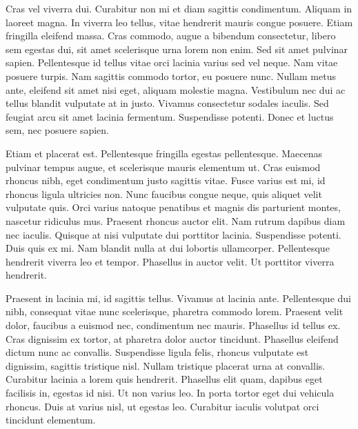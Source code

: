 \documentclass{article}
\begin{document}
Cras vel viverra dui. Curabitur non mi et diam sagittis condimentum. Aliquam in laoreet magna. In viverra leo tellus, vitae hendrerit mauris congue posuere. Etiam fringilla eleifend massa. Cras commodo, augue a bibendum consectetur, libero sem egestas dui, sit amet scelerisque urna lorem non enim. Sed sit amet pulvinar sapien. Pellentesque id tellus vitae orci lacinia varius sed vel neque. Nam vitae posuere turpis. Nam sagittis commodo tortor, eu posuere nunc. Nullam metus ante, eleifend sit amet nisi eget, aliquam molestie magna. Vestibulum nec dui ac tellus blandit vulputate at in justo. Vivamus consectetur sodales iaculis. Sed feugiat arcu sit amet lacinia fermentum. Suspendisse potenti. Donec et luctus sem, nec posuere sapien.

Etiam et placerat est. Pellentesque fringilla egestas pellentesque. Maecenas pulvinar tempus augue, et scelerisque mauris elementum ut. Cras euismod rhoncus nibh, eget condimentum justo sagittis vitae. Fusce varius est mi, id rhoncus ligula ultricies non. Nunc faucibus congue neque, quis aliquet velit vulputate quis. Orci varius natoque penatibus et magnis dis parturient montes, nascetur ridiculus mus. Praesent rhoncus auctor elit. Nam rutrum dapibus diam nec iaculis. Quisque at nisi vulputate dui porttitor lacinia. Suspendisse potenti. Duis quis ex mi. Nam blandit nulla at dui lobortis ullamcorper. Pellentesque hendrerit viverra leo et tempor. Phasellus in auctor velit. Ut porttitor viverra hendrerit.

Praesent in lacinia mi, id sagittis tellus. Vivamus at lacinia ante. Pellentesque dui nibh, consequat vitae nunc scelerisque, pharetra commodo lorem. Praesent velit dolor, faucibus a euismod nec, condimentum nec mauris. Phasellus id tellus ex. Cras dignissim ex tortor, at pharetra dolor auctor tincidunt. Phasellus eleifend dictum nunc ac convallis. Suspendisse ligula felis, rhoncus vulputate est dignissim, sagittis tristique nisl. Nullam tristique placerat urna at convallis. Curabitur lacinia a lorem quis hendrerit. Phasellus elit quam, dapibus eget facilisis in, egestas id nisi. Ut non varius leo. In porta tortor eget dui vehicula rhoncus. Duis at varius nisl, ut egestas leo. Curabitur iaculis volutpat orci tincidunt elementum. 


\printbibliography[type=article,title={Same artykuły, ale z fizyki},keyword={physics},heading=bibintoc]
\printbibliography[type=article,title={Same artykuły, ale z matematyki},keyword={mathematics}]
\end{document}
